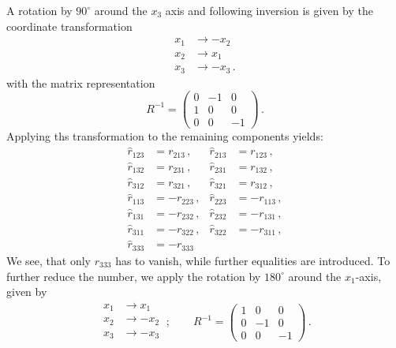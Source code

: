 A rotation by $90^\circ$ around the  
$x_3$ axis and following 
inversion is given by the coordinate transformation 
\begin{equation}
    \begin{split}
    x_1 &\rightarrow -x_2  \\
    x_2 &\rightarrow x_1 \\
    x_3 &\rightarrow -x_3  \, .
    \end{split}
\end{equation}
with the matrix representation
\begin{equation}
    R^{-1} = 
    \begin{pmatrix}
    0 & -1 &  0 \\
    1 &  0 &  0 \\
    0 &  0 & -1 
    \end{pmatrix} \, .
\end{equation}
Applying ths transformation to the remaining components yields:
\begin{align*}
    \hat{r}_{123} &=  r_{213} \, ,&  
    \hat{r}_{213} &=  r_{123} \, , \\
    \hat{r}_{132} &=  r_{231} \, ,&    
    \hat{r}_{231} &=  r_{132} \, , \\
    \hat{r}_{312} &=  r_{321} \, ,&   
    \hat{r}_{321} &=  r_{312} \, , \\
    \hat{r}_{113} &= -r_{223} \, ,&  
    \hat{r}_{223} &= -r_{113} \, , \\
    \hat{r}_{131} &= -r_{232} \, ,&  
    \hat{r}_{232} &= -r_{131} \, , \\
    \hat{r}_{311} &= -r_{322} \, ,&  
    \hat{r}_{322} &= -r_{311} \, , \\
    \hat{r}_{333} &= -r_{333} \,         %
\end{align*}
We see, that only $r_{333}$ has to vanish, while further 
equalities are introduced. 
To further reduce the number, we  apply the rotation by 
$180^\circ$ around the $x_1$-axis, given by 
\begin{equation}
    \begin{split}
    x_1 &\rightarrow x_1  \\
    x_2 &\rightarrow -x_2 \\
    x_3 &\rightarrow -x_3 \\
    \end{split} \ ; \qquad
    R^{-1} = 
    \begin{pmatrix}
    1 &  0 &  0 \\
    0 & -1 &  0 \\
    0 &  0 & -1 
    \end{pmatrix} \, .
\end{equation}
